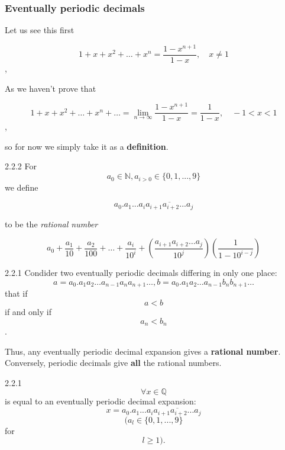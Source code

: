 \documentclass[a4paper]{article}
\begin{document}
\subsubsection{Eventually periodic decimals}
Let us see this first
\begin{center}
    $$1+x+x^2+\ldots +x^n=\frac{1-x^{n+1}}{1-x}, \quad x\neq 1$$,
\end{center}
As we haven't prove that 
\begin{center}
    $$1+x+x^2+\ldots+x^n+\ldots = \lim_{n \to \infty}\frac{1-x^{n+1}}{1-x}=\frac{1}{1-x},\quad -1<x<1$$,
\end{center}
so for now we simply take it as a \textbf{definition}.
\begin{definition}{2.2.2}{}
    For $$a_0 \in \mathbb{N},a_{i>0}\in \{0,1,...,9\}$$ we define
    \begin{center}
        $$a_0.a_1...a_i \overline{a_{i+1}a_{i+2}...a_j}$$
    \end{center}
    to be the \emph{rational number}
    \begin{center}
        $$a_0+\frac{a_1}{10}+\frac{a_2}{100}+ \ldots +\frac{a_i}{10^i}+(\frac{a_{i+1}a_{i+2}\ldots a_j}{10^j})(\frac{1}{1-10^{i-j}})$$
    \end{center}
\end{definition}
\begin{proposition}{2.2.1}{}
Condider two eventually periodic decimals differing in only one place:
    \begin{equation}
        a=a_0.a_1a_2 \ldots a_{n-1}a_na_{n+1}\ldots,b=a_0.a_1a_2\ldots a_{n-1}b_nb_{n+1}\ldots \tag{2.6}
    \end{equation}
    that if $$a<b$$ if and only if $$a_n<b_n$$.
\end{proposition}
Thus, any eventually periodic decimal expansion gives a \textbf{rational number}. Conversely, periodic decimals give \textbf{all} the rational numbers.
\begin{theorem}{2.2.1}{}
         $$\forall x\in \mathbb{Q}$$ is equal to an eventually periodic decimal expansion: $$x=a_0.a_1...a_i\overline{a_{i+1}a_{i+2}...a_j}$$ $$(a_l \in \{0,1,...,9\} $$ for $$l \geq 1).$$
\end{theorem}
\end{document}
